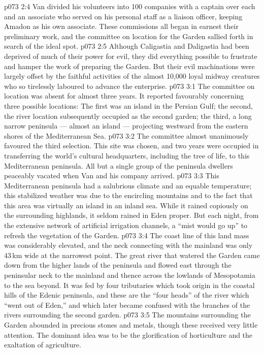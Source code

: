 \vs p073 2:4 Van divided his volunteers into 100 companies with a captain over each and an associate who served on his personal staff as a liaison officer, keeping Amadon as his own associate. These commissions all began in earnest their preliminary work, and the committee on location for the Garden sallied forth in search of the ideal spot.
\vs p073 2:5 \pc Although Caligastia and Daligastia had been deprived of much of their power for evil, they did everything possible to frustrate and hamper the work of preparing the Garden. But their evil machinations were largely offset by the faithful activities of the almost 10,000 loyal midway creatures who so tirelessly laboured to advance the enterprise.
\vs p073 3:1 The committee on location was absent for almost three years. It reported favourably concerning three possible locations: The first was an island in the Persian Gulf; the second, the river location subsequently occupied as the second garden; the third, a long narrow peninsula --- almost an island --- projecting westward from the eastern shores of the Mediterranean Sea.
\vs p073 3:2 The committee almost unanimously favoured the third selection. This site was chosen, and two years were occupied in transferring the world’s cultural headquarters, including the tree of life, to this Mediterranean peninsula. All but a single group of the peninsula dwellers peaceably vacated when Van and his company arrived.
\vs p073 3:3 \pc This Mediterranean peninsula had a salubrious climate and an equable temperature; this stabilized weather was due to the encircling mountains and to the fact that this area was virtually an island in an inland sea. While it rained copiously on the surrounding highlands, it seldom rained in Eden proper. But each night, from the extensive network of artificial irrigation channels, a “mist would go up” to refresh the vegetation of the Garden.
\vs p073 3:4 The coast line of this land mass was considerably elevated, and the neck connecting with the mainland was only 43\,km wide at the narrowest point. The great river that watered the Garden came down from the higher lands of the peninsula and flowed east through the peninsular neck to the mainland and thence across the lowlands of Mesopotamia to the sea beyond. It was fed by four tributaries which took origin in the coastal hills of the Edenic peninsula, and these are the “four heads” of the river which “went out of Eden,” and which later became confused with the branches of the rivers surrounding the second garden.
\vs p073 3:5 The mountains surrounding the Garden abounded in precious stones and metals, though these received very little attention. The dominant idea was to be the glorification of horticulture and the exaltation of agriculture.
